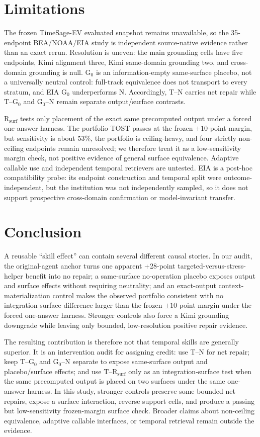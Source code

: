 \section{Limitations}
\label{sec:limitations}
The frozen TimeSage-EV evaluated snapshot remains unavailable, so the 35-endpoint BEA/NOAA/EIA study is independent source-native evidence rather than an exact rerun. Resolution is uneven: the main grounding cells have five endpoints, Kimi alignment three, Kimi same-domain grounding two, and cross-domain grounding is null. G$_0$ is an information-empty same-surface placebo, not a universally neutral control: full-track equivalence does not transport to every stratum, and EIA G$_0$ underperforms N. Accordingly, T--N carries net repair while T--G$_0$ and G$_0$--N remain separate output/surface contrasts.

R$_{\mathrm{surf}}$ tests only placement of the exact same precomputed output under a forced one-answer harness. The portfolio TOST passes at the frozen $\pm10$-point margin, but sensitivity is about 53\%, the portfolio is ceiling-heavy, and four strictly non-ceiling endpoints remain unresolved; we therefore treat it as a low-sensitivity margin check, not positive evidence of general surface equivalence. Adaptive callable use and independent temporal retrievers are untested. EIA is a post-hoc compatibility probe: its endpoint construction and temporal split were outcome-independent, but the institution was not independently sampled, so it does not support prospective cross-domain confirmation or model-invariant transfer.

\section{Conclusion}
A reusable ``skill effect'' can contain several different causal stories. In our audit, the original-agent anchor turns one apparent +28-point targeted-versus-stress-helper benefit into no repair; a same-surface no-operation placebo exposes output and surface effects without requiring neutrality; and an exact-output context-materialization control makes the observed portfolio consistent with no integration-surface difference larger than the frozen $\pm10$-point margin under the forced one-answer harness. Stronger controls also force a Kimi grounding downgrade while leaving only bounded, low-resolution positive repair evidence.

The resulting contribution is therefore not that temporal skills are generally superior. It is an intervention audit for assigning credit: use T--N for net repair; keep T--G$_0$ and G$_0$--N separate to expose same-surface output and placebo/surface effects; and use T--R$_{\mathrm{surf}}$ only as an integration-surface test when the same precomputed output is placed on two surfaces under the same one-answer harness. In this study, stronger controls preserve some bounded net repairs, expose a surface interaction, reverse support cells, and produce a passing but low-sensitivity frozen-margin surface check. Broader claims about non-ceiling equivalence, adaptive callable interfaces, or temporal retrieval remain outside the evidence.
